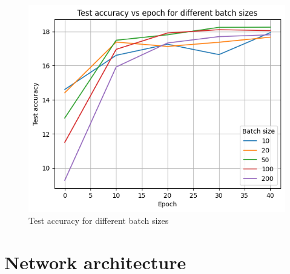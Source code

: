 \documentclass[eng]{class}
\begin{document}
\begin{figure}[h]
  \centering
  \includegraphics[width=.8\columnwidth]{images/batch_size.png}
  \caption{Test accuracy for different batch sizes}
  \label{fig-2}
\end{figure}
\section{Network architecture}
\pagestyle{OtherPage}
\end{document}
